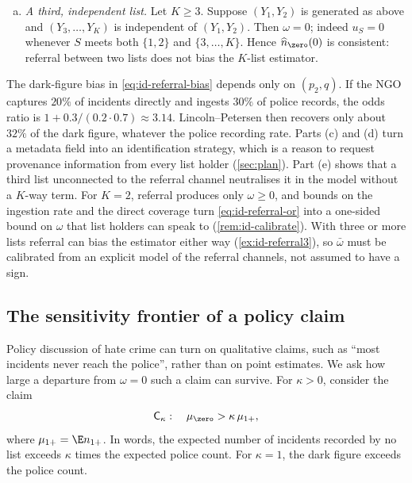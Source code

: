 \begin{proposition}
\begin{enumerate}[(a)]
  \[
    \Nhat^{\ddagger}=n_Z+\frac{(n_{1+}-n_Z)(m_{11}+n_{01})}{m_{11}} .
  \]
  The reduced table has odds ratio one, and $\Nhat^{\ddagger}/N\to1$ almost surely.
  \item \emph{A third, independent list.} Let $K\ge3$. Suppose $(Y_1,Y_2)$ is generated as above and $(Y_3,\dots,Y_K)$ is independent of $(Y_1,Y_2)$. Then $\omega=0$; indeed $u_S=0$ whenever $S$ meets both $\{1,2\}$ and $\{3,\dots,K\}$. Hence $\widehat n_{\zero}(0)$ is consistent: referral between two lists does not bias the $K$-list estimator.
\end{enumerate}
\end{proposition}

The dark-figure bias in \eqref{eq:id-referral-bias} depends only on $(p_2,q)$. If the NGO captures $20\%$ of incidents directly and ingests $30\%$ of police records, the odds ratio is $1+0.3/(0.2\cdot0.7)\approx3.14$. Lincoln--Petersen then recovers only about $32\%$ of the dark figure, whatever the police recording rate. Parts (c) and (d) turn a metadata field into an identification strategy, which is a reason to request provenance information from every list holder (\cref{sec:plan}). Part (e) shows that a third list unconnected to the referral channel neutralises it in the model without a $K$-way term. For $K=2$, referral produces only $\omega\ge0$, and bounds on the ingestion rate and the direct coverage turn \eqref{eq:id-referral-or} into a one-sided bound on $\omega$ that list holders can speak to (\cref{rem:id-calibrate}). With three or more lists referral can bias the estimator either way (\cref{ex:id-referral3}), so $\bar\omega$ must be calibrated from an explicit model of the referral channels, not assumed to have a sign.

\subsection{The sensitivity frontier of a policy claim}\label{sec:id-frontier}

Policy discussion of hate crime can turn on qualitative claims, such as ``most incidents never reach the police'', rather than on point estimates. We ask how large a departure from $\omega=0$ such a claim can survive. For $\kappa>0$, consider the claim
\[
  \mathsf C_\kappa:\quad\mu_{\zero}>\kappa\,\mu_{1+},
\]
where $\mu_{1+}=\E n_{1+}$. In words, the expected number of incidents recorded by no list exceeds $\kappa$ times the expected police count. For $\kappa=1$, the dark figure exceeds the police count.


